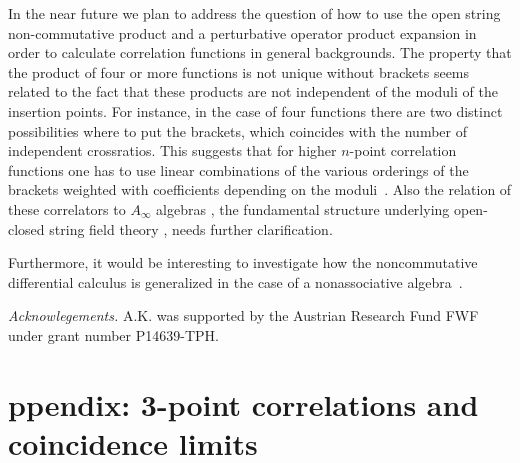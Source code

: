 \documentclass[a4paper,12pt]{article}
\begin{document}
In the near future we plan to address the question of how to use the 
open string non-commutative product and a perturbative operator product 
expansion in order to calculate correlation functions in general backgrounds. 
The property that the product of four or more functions is not unique without 
brackets seems related to the fact that these products are not independent of 
the moduli of the insertion points. For instance, in the case of four 
functions there are two distinct possibilities where to put the brackets, 
which coincides with the number of independent crossratios. This suggests 
that for 
higher $n$-point correlation functions one has to use linear combinations 
of the various orderings of the brackets weighted with coefficients 
depending on the moduli~\cite{Ho:2001qk}. 
Also the relation of these correlators to $A_\infty$ algebras \cite{stasheff}, 
the fundamental structure underlying
open-closed string field theory \cite{zwiebach}, needs further clarification.

Furthermore, it would be interesting to investigate how the 
noncommutative differential calculus is generalized in the case of a 
nonassociative algebra~\cite{Ho:2001fi}.

{\it Acknowlegements.}
A.K. was supported by the Austrian 
Research Fund FWF under grant number P14639-TPH.


\newpage

\appendix


\section{\hspace*{-20pt}ppendix: 3-point correlations and coincidence limits}
\label{sec:appx}
\end{document}
